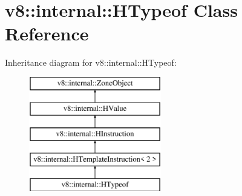 \hypertarget{classv8_1_1internal_1_1_h_typeof}{}\section{v8\+:\+:internal\+:\+:H\+Typeof Class Reference}
\label{classv8_1_1internal_1_1_h_typeof}
Inheritance diagram for v8\+:\+:internal\+:\+:H\+Typeof\+:\begin{figure}[H]
\begin{center}
\leavevmode
\includegraphics[height=5.000000cm]{classv8_1_1internal_1_1_h_typeof}
\end{center}
\end{figure}
